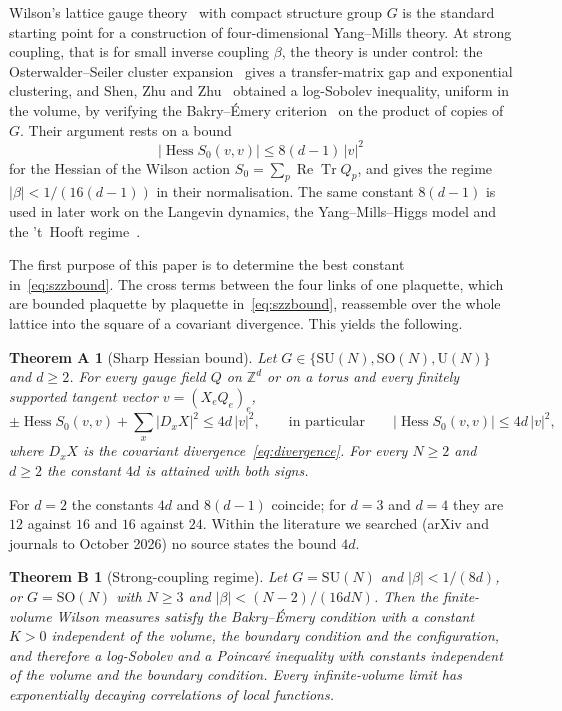 \documentclass[11pt]{amsart}
\newtheorem*{theoremA}{Theorem A}
\newtheorem*{theoremB}{Theorem B}
\theoremstyle{definition}
\theoremstyle{remark}
\newcommand{\Z}{\mathbb{Z}}
\newcommand{\SU}{\mathrm{SU}}
\newcommand{\SO}{\mathrm{SO}}
\newcommand{\U}{\mathrm{U}}
\newcommand{\ReTr}{\operatorname{Re}\operatorname{Tr}}
\newcommand{\Hess}{\operatorname{Hess}}
\begin{document}
Wilson's lattice gauge theory~\cite{Wil74} with compact structure group $G$ is
the standard starting point for a construction of four-dimensional Yang--Mills
theory. At strong coupling, that is for small inverse coupling $\beta$, the
theory is under control: the Osterwalder--Seiler cluster
expansion~\cite{OSei78,Sei82} gives a transfer-matrix gap and exponential
clustering, and Shen, Zhu and Zhu~\cite{SZZ23} obtained a log-Sobolev
inequality, uniform in the volume, by verifying the Bakry--\'Emery
criterion~\cite{BE85,BGL14} on the product of copies of $G$. Their argument
rests on a bound
\begin{equation}\label{eq:szzbound}
|\Hess S_0(v,v)|\le 8(d-1)\,|v|^2
\end{equation}
for the Hessian of the Wilson action $S_0=\sum_p\ReTr Q_p$, and gives the
regime $|\beta|<1/(16(d-1))$ in their normalisation. The same constant
$8(d-1)$ is used in later work on the Langevin dynamics, the Yang--Mills--Higgs
model and the 't~Hooft regime~\cite{CNS25b,Nis25,SSZ26}.

The first purpose of this paper is to determine the best constant
in~\eqref{eq:szzbound}. The cross terms between the four links of one
plaquette, which are bounded plaquette by plaquette in~\eqref{eq:szzbound},
reassemble over the whole lattice into the square of a covariant divergence.
This yields the following.

\begin{theoremA}[Sharp Hessian bound]
Let $G\in\{\SU(N),\SO(N),\U(N)\}$ and $d\ge2$. For every gauge field $Q$ on
$\Z^d$ or on a torus and every finitely supported tangent vector
$v=(X_eQ_e)_e$,
\[
\pm\Hess S_0(v,v)+\sum_x|D_xX|^2\le 4d\,|v|^2,
\qquad\text{in particular}\qquad |\Hess S_0(v,v)|\le 4d\,|v|^2,
\]
where $D_xX$ is the covariant divergence~\eqref{eq:divergence}. For every
$N\ge2$ and $d\ge2$ the constant $4d$ is attained with both signs.
\end{theoremA}

For $d=2$ the constants $4d$ and $8(d-1)$ coincide; for $d=3$ and $d=4$ they
are $12$ against $16$ and $16$ against $24$. Within the literature we searched
(arXiv and journals to October 2026) no source states the bound $4d$.

\begin{theoremB}[Strong-coupling regime]
Let $G=\SU(N)$ and $|\beta|<1/(8d)$, or $G=\SO(N)$ with $N\ge3$ and
$|\beta|<(N-2)/(16dN)$. Then the finite-volume Wilson measures satisfy the
Bakry--\'Emery condition with a constant $K>0$ independent of the volume, the
boundary condition and the configuration, and therefore a log-Sobolev and a
Poincar\'e inequality with constants independent of the volume and the
boundary condition. Every infinite-volume limit has exponentially decaying
correlations of local functions.
\end{theoremB}
\end{document}
